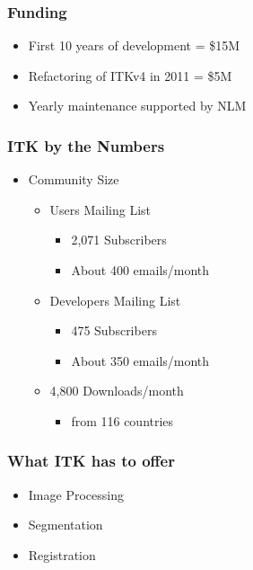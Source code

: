 \begin{frame}
\frametitle{Funding}
\begin{itemize}
\item First 10 years of development = \$15M
\pause
\item Refactoring of ITKv4 in 2011 = \$5M
\pause
\item Yearly maintenance supported by NLM
\end{itemize}
\end{frame}


\begin{frame}
\frametitle{ITK by the Numbers}
\begin{itemize}
\item Community Size
\pause
\begin{itemize}
\item Users Mailing List
\pause
\begin{itemize}
\item 2,071 Subscribers
\item About 400 emails/month
\end{itemize}
\end{itemize}
\pause
\begin{itemize}
\item Developers Mailing List
\begin{itemize}
\item 475 Subscribers
\item About 350 emails/month
\end{itemize}
\end{itemize}
\pause
\begin{itemize}
\item 4,800 Downloads/month
\pause
\begin{itemize}
\item from 116 countries
\end{itemize}
\end{itemize}
\end{itemize}
\end{frame}

\begin{frame}
\frametitle{What ITK has to offer}
\begin{itemize}
\item Image Processing
\pause
\item Segmentation
\pause
\item Registration
\end{itemize}
\end{frame}

